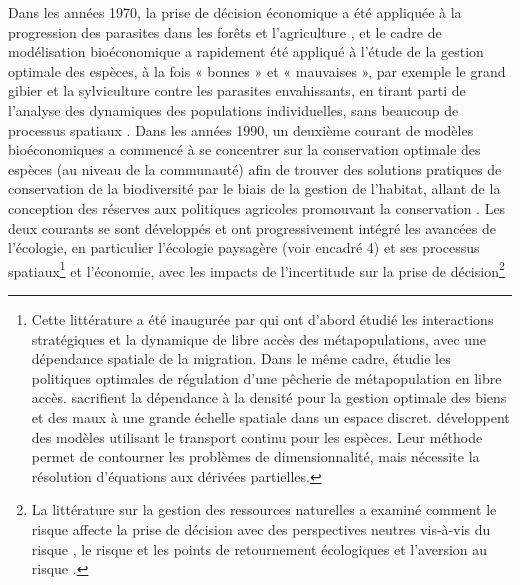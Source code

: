 Dans les années 1970, la prise de décision économique a été appliquée à la progression des parasites dans les forêts et l'agriculture \citep{Hueth1974, Feder1975}, et le cadre de modélisation bioéconomique a rapidement été appliqué à l'étude de la gestion optimale des espèces, à la fois « bonnes » et « mauvaises », par exemple le grand gibier et la sylviculture contre les parasites envahissants, en tirant parti de l'analyse des dynamiques des populations individuelles, sans beaucoup de processus spatiaux \citep{swanson_economics_1994, Skonhoft1999_on,ALEXANDER2000, Horan2002}.  Dans les années 1990, un deuxième courant de modèles bioéconomiques a commencé à se concentrer sur la conservation optimale des espèces (au niveau de la communauté) afin de trouver des solutions pratiques de conservation de la biodiversité par le biais de la gestion de l'habitat, allant de la conception des réserves aux politiques agricoles promouvant la conservation \citep{costello_dynamic_2004, Polasky2001,Polasky2005, Watzold2016a, Mouysset2011}. Les deux courants se sont développés et ont progressivement intégré les avancées de l'écologie, en particulier l'écologie paysagère (voir encadré 4) et ses processus spatiaux\footnote{Cette littérature a été inaugurée par \cite{huffaker_optimal_1992, brown_metapopulation_1997, sanchirico_bioeconomics_1999} qui ont d'abord étudié les interactions stratégiques et la dynamique de libre accès des métapopulations, avec une dépendance spatiale de la migration. Dans le même cadre, \cite{SANCHIRICO200523} étudie les politiques optimales de régulation d'une pêcherie de métapopulation en libre accès. \cite{costello_optimal_2008, blackwood_cost-effective_2010} sacrifient la dépendance à la densité pour la gestion optimale des biens et des maux à une grande échelle spatiale dans un espace discret. \cite{brock_pattern_2010, brock_2020} développent des modèles utilisant le transport continu pour les espèces. Leur méthode permet de contourner les problèmes de dimensionnalité, mais nécessite la résolution d'équations aux dérivées partielles.} et l'économie, avec les impacts de l'incertitude sur la prise de décision\footnote{La littérature sur la gestion des ressources naturelles a examiné comment le risque affecte la prise de décision avec des perspectives neutres vis-à-vis du risque \citep{reed_1979_optimal, costello_optimal_2008}, le risque et les points de retournement écologiques \citep{costello_renewable_2019} et l'aversion au risque \citep{McGoughPlantingaCostello+2009,
kapaun_does_2013,TAHVONEN2018659}.
}
